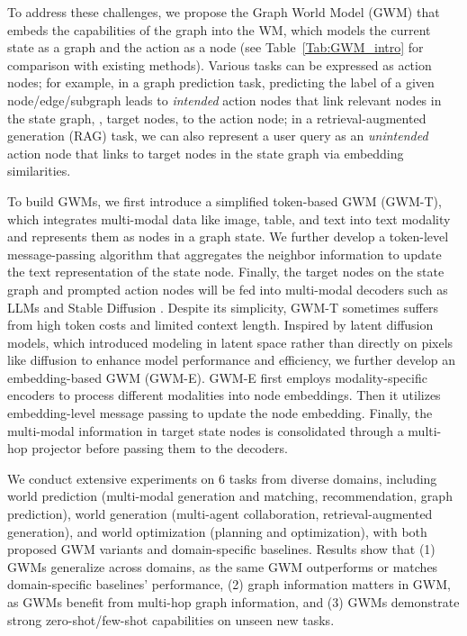 To address these challenges, we propose the Graph World Model (GWM) that embeds the capabilities of the graph into the WM, which models the current state as a graph and the action as a node (see Table~\ref{Tab:GWM_intro} for comparison with existing methods).
Various tasks can be expressed as action nodes; for example, in a graph prediction task, predicting the label of a given node/edge/subgraph leads to \textit{intended} action nodes that link relevant nodes in the state graph, \ie, target nodes, to the action node; in a retrieval-augmented generation (RAG) task, we can also represent a user query as an \textit{unintended} action node that links to target nodes in the state graph via embedding similarities.

To build GWMs, we first introduce a simplified token-based GWM (GWM-T), which integrates multi-modal data like image, table, and text into text modality and represents them as nodes in a graph state. We further develop a token-level message-passing algorithm that aggregates the neighbor information to update the text representation of the state node. Finally, the target nodes on the state graph and prompted action nodes will be fed into multi-modal decoders such as LLMs and Stable Diffusion \cite{rombach2022high}. Despite its simplicity, GWM-T sometimes suffers from high token costs and limited context length. Inspired by latent diffusion models, which introduced modeling in latent space rather than directly on pixels like diffusion to enhance model performance and efficiency, we further develop an embedding-based GWM (GWM-E). GWM-E first employs modality-specific encoders to process different modalities into node embeddings. Then it utilizes embedding-level message
passing to update the node embedding. Finally, the multi-modal information in target state nodes is consolidated through a multi-hop projector before passing them to the decoders. 

We conduct extensive experiments on 6 tasks from diverse domains, including world prediction (multi-modal generation and matching, recommendation, graph prediction), world generation (multi-agent collaboration, retrieval-augmented generation), and world optimization (planning and optimization), with both proposed GWM variants and domain-specific baselines. Results show that (1) GWMs generalize across domains, as the same GWM outperforms or matches domain-specific baselines' performance, (2) graph information matters in GWM, as GWMs benefit from multi-hop graph information, and (3) GWMs demonstrate strong zero-shot/few-shot capabilities on unseen new tasks.

